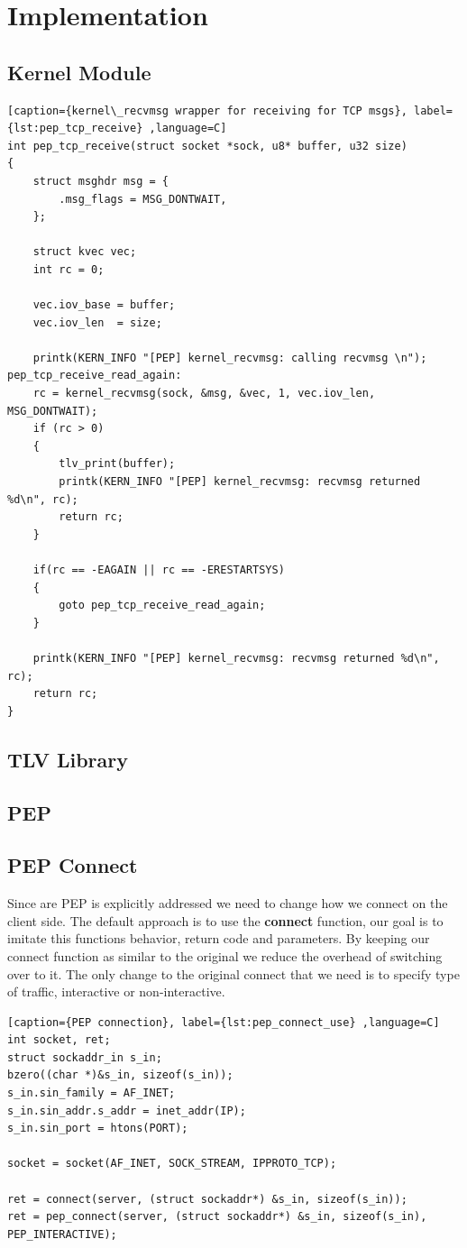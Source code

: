 \documentclass[a4paper,english, 11pt]{report}
\begin{document}
\chapter{Implementation}

\section{Kernel Module}

\begin{lstlisting}[caption={kernel\_recvmsg wrapper for receiving for TCP msgs}, label={lst:pep_tcp_receive} ,language=C]
int pep_tcp_receive(struct socket *sock, u8* buffer, u32 size)
{
	struct msghdr msg = {
		.msg_flags = MSG_DONTWAIT,
	};

	struct kvec vec;
	int rc = 0;

	vec.iov_base = buffer;
	vec.iov_len  = size;

	printk(KERN_INFO "[PEP] kernel_recvmsg: calling recvmsg \n");
pep_tcp_receive_read_again:
	rc = kernel_recvmsg(sock, &msg, &vec, 1, vec.iov_len, MSG_DONTWAIT);
	if (rc > 0)
	{
		tlv_print(buffer);
		printk(KERN_INFO "[PEP] kernel_recvmsg: recvmsg returned %d\n", rc);
		return rc;
	}

	if(rc == -EAGAIN || rc == -ERESTARTSYS)
	{
		goto pep_tcp_receive_read_again;
	}

	printk(KERN_INFO "[PEP] kernel_recvmsg: recvmsg returned %d\n", rc);
	return rc;
}
\end{lstlisting}

\section{TLV Library}

\section{PEP}

\section{PEP Connect}
Since are PEP is explicitly addressed we need to change how we connect on the client side.
The default approach is to use the \textbf{connect} function, our goal is to imitate this functions behavior, return code and parameters. By keeping our connect function as similar to the original we reduce the overhead of switching over to it. The only change to the original connect that we need is to specify type of traffic, interactive or non-interactive.
\begin{lstlisting}[caption={PEP connection}, label={lst:pep_connect_use} ,language=C]
int socket, ret;
struct sockaddr_in s_in;
bzero((char *)&s_in, sizeof(s_in));
s_in.sin_family = AF_INET;
s_in.sin_addr.s_addr = inet_addr(IP);
s_in.sin_port = htons(PORT);

socket = socket(AF_INET, SOCK_STREAM, IPPROTO_TCP);

ret = connect(server, (struct sockaddr*) &s_in, sizeof(s_in));
ret = pep_connect(server, (struct sockaddr*) &s_in, sizeof(s_in), PEP_INTERACTIVE);
\end{lstlisting}
\end{document}
